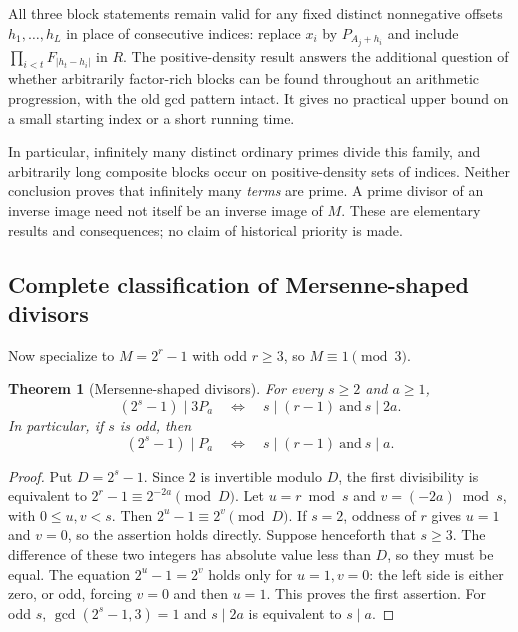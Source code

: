 \documentclass[11pt,a4paper]{article}
\newtheorem{theorem}{Theorem}[section]
\theoremstyle{definition}
\theoremstyle{remark}
\numberwithin{equation}{section}
\begin{document}
All three block statements remain valid for any fixed distinct
nonnegative offsets $h_1,\ldots,h_L$ in place of consecutive indices:
replace $x_i$ by $P_{A_j+h_i}$ and include
$\prod_{i<t}F_{|h_t-h_i|}$ in $R$. The positive-density result answers
the additional question of whether arbitrarily factor-rich blocks can
be found throughout an arithmetic progression, with the old gcd
pattern intact. It gives no practical upper bound on a small starting
index or a short running time.

In particular, infinitely many distinct ordinary primes divide this
family, and arbitrarily long composite blocks occur on positive-density
sets of indices. Neither conclusion proves that infinitely many
\emph{terms} are prime. A prime divisor of an inverse image need not
itself be an inverse image of $M$. These are elementary results and
consequences; no claim of historical priority is made.

\subsection{Complete classification of Mersenne-shaped divisors}
Now specialize to $M=2^r-1$ with odd $r\ge3$, so $M\equiv1\pmod3$.
\begin{theorem}[Mersenne-shaped divisors]\label{A:thm:mersenne-divisor}
For every $s\ge2$ and $a\ge1$,
\[
 (2^s-1)\mid3P_a
 \quad\Longleftrightarrow\quad
 s\mid(r-1)\ \text{and}\ s\mid2a.
\]
In particular, if $s$ is odd, then
\[
 (2^s-1)\mid P_a
 \quad\Longleftrightarrow\quad
 s\mid(r-1)\ \text{and}\ s\mid a.
\]
\end{theorem}
\begin{proof}
Put $D=2^s-1$. Since $2$ is invertible modulo $D$, the first divisibility
is equivalent to $2^r-1\equiv2^{-2a}\pmod D$. Let
$u=r\bmod s$ and $v=(-2a)\bmod s$, with $0\le u,v<s$. Then
$2^u-1\equiv2^v\pmod D$. If $s=2$, oddness of $r$ gives $u=1$ and $v=0$, so the assertion holds directly. Suppose henceforth that $s\ge3$. The difference of these two integers has
absolute value less than $D$, so they must be equal. The equation
$2^u-1=2^v$ holds only for $u=1,v=0$: the left side is either zero, or
odd, forcing $v=0$ and then $u=1$. This proves the first assertion.
For odd $s$, $\gcd(2^s-1,3)=1$ and $s\mid2a$ is equivalent to $s\mid a$.
\end{proof}
\end{document}
